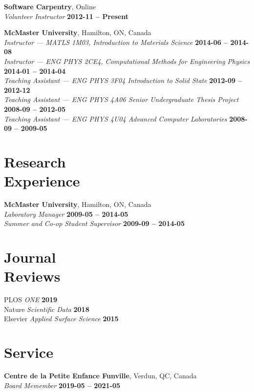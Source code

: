 \documentclass[margin1,line,canadian]{resume}
\begin{document}
\begin{resume}
 \textbf{Software Carpentry}, Online\\%
 \textsl{Volunteer Instructor} \hfill \textbf{2012-11 -- Present}

 \vspace{-2mm}
 \textbf{McMaster University}, Hamilton, ON, Canada \\%
 \textsl{Instructor --- MATLS 1M03, Introduction to Materials Science} \hfill \textbf{2014-06 -- 2014-08}\\
 \textsl{Instructor --- ENG PHYS 2CE4, Computational Methods for Engineering Physics} \hfill \textbf{2014-01 -- 2014-04}\\
 \textsl{Teaching Assistant --- ENG PHYS 3F04 Introduction to Solid State} \hfill \textbf{2012-09 -- 2012-12}\\
 \textsl{Teaching Assistant --- ENG PHYS 4A06 Senior Undergraduate Thesis Project} \hfill  \textbf{2008-09 -- 2012-05}\\
 \textsl{Teaching Assistant --- ENG PHYS 4U04 Advanced Computer Laboratories} \hfill \textbf{2008-09 -- 2009-05}

 \section{\mysidestyle Research\\Experience}
 \textbf{McMaster University}, Hamilton, ON, Canada\\%
 \textsl{Laboratory Manager} \hfill \textbf{2009-05 -- 2014-05}\\
 \textsl{Summer and Co-op Student Supervisor} \hfill \textbf{2009-09 -- 2014-05}\\

 \section{\mysidestyle Journal\\Reviews}
 PLOS \textsl{ONE} \hfill \textbf{2019}\\
 Nature \textsl{Scientific Data} \hfill \textbf{2018}\\
 Elsevier \textsl{Applied Surface Science} \hfill \textbf{2015}\\

\section{\mysidestyle Service}
\textbf{Centre de la Petite Enfance Funville}, Verdun, QC, Canada\\%
\textsl{Board Memember} \hfill \textbf{2019-05 -- 2021-05}


\end{resume}
\end{document}
